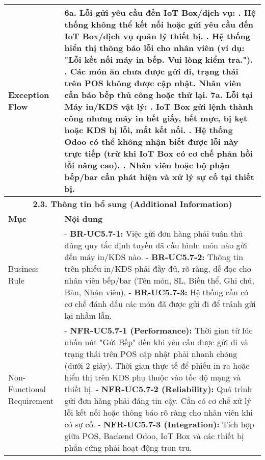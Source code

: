 \begin{longtable}{|m{4cm}|p{11cm}|}
Exception Flow & \textbf{6a. Lỗi gửi yêu cầu đến IoT Box/dịch vụ:} \newline    1. Hệ thống không thể kết nối hoặc gửi yêu cầu đến IoT Box/dịch vụ quản lý thiết bị. \newline    2. Hệ thống hiển thị thông báo lỗi cho nhân viên (ví dụ: "Lỗi kết nối máy in bếp. Vui lòng kiểm tra."). \newline    3. Các món ăn chưa được gửi đi, trạng thái trên POS không được cập nhật. Nhân viên cần báo bếp thủ công hoặc thử lại. \newline \textbf{7a. Lỗi tại Máy in/KDS vật lý:} \newline    1. IoT Box gửi lệnh thành công nhưng máy in hết giấy, hết mực, bị kẹt hoặc KDS bị lỗi, mất kết nối. \newline    2. Hệ thống Odoo có thể không nhận biết được lỗi này trực tiếp (trừ khi IoT Box có cơ chế phản hồi lỗi nâng cao). \newline    3. Nhân viên hoặc bộ phận bếp/bar cần phát hiện và xử lý sự cố tại thiết bị. \\
\hline
\multicolumn{2}{|c|}{\textbf{2.3. Thông tin bổ sung (Additional Information)}} \\
\hline
\textbf{Mục} & \textbf{Nội dung} \\
\hline
Business Rule & - \textbf{BR-UC5.7-1:} Việc gửi đơn hàng phải tuân thủ đúng quy tắc định tuyến đã cấu hình: món nào gửi đến máy in/KDS nào. \newline - \textbf{BR-UC5.7-2:} Thông tin trên phiếu in/KDS phải đầy đủ, rõ ràng, dễ đọc cho nhân viên bếp/bar (Tên món, SL, Biến thể, Ghi chú, Bàn, Nhân viên). \newline - \textbf{BR-UC5.7-3:} Hệ thống cần có cơ chế đánh dấu các món đã được gửi đi để tránh gửi lại nhầm lẫn. \\
\hline
Non-Functional Requirement & - \textbf{NFR-UC5.7-1 (Performance):} Thời gian từ lúc nhấn nút "Gửi Bếp" đến khi yêu cầu được gửi đi và trạng thái trên POS cập nhật phải nhanh chóng (dưới 2 giây). Thời gian thực tế để phiếu in ra hoặc hiển thị trên KDS phụ thuộc vào tốc độ mạng và thiết bị. \newline - \textbf{NFR-UC5.7-2 (Reliability):} Quá trình gửi đơn hàng phải đáng tin cậy. Cần có cơ chế xử lý lỗi kết nối hoặc thông báo rõ ràng cho nhân viên khi có sự cố. \newline - \textbf{NFR-UC5.7-3 (Integration):} Tích hợp giữa POS, Backend Odoo, IoT Box và các thiết bị phần cứng phải hoạt động trơn tru. \\
\hline
\end{longtable}

